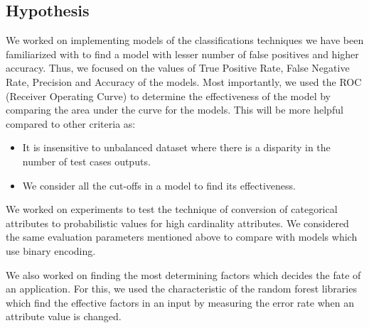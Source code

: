 \documentclass{article} %
\begin{document}
	\subsection{Hypothesis}
	We worked on implementing models of the classifications techniques we have been familiarized with to find a model with lesser number of false positives and higher accuracy. Thus, we focused on the values of True Positive Rate, False Negative Rate, Precision and Accuracy of the models. Most importantly, we used the ROC (Receiver Operating Curve) to determine the effectiveness of the model by comparing the area under the curve for the models. This will be more helpful compared to other criteria as:
	\begin{itemize}
		\item It is insensitive to unbalanced dataset where there is a disparity in the number of test cases outputs.  
		\item We consider all the cut-offs in a model to find its effectiveness.
	\end{itemize}
	
	We worked on experiments to test the technique of conversion of categorical attributes to probabilistic values for high cardinality attributes\cite{HighCard}. We considered the same evaluation parameters mentioned above to compare with models which use binary encoding. 
	
	We also worked on finding the most determining factors which decides the fate of an application. For this, we used the characteristic of the random forest libraries which find the effective factors in an input by measuring the error rate when an attribute value is changed. 
\end{document}
